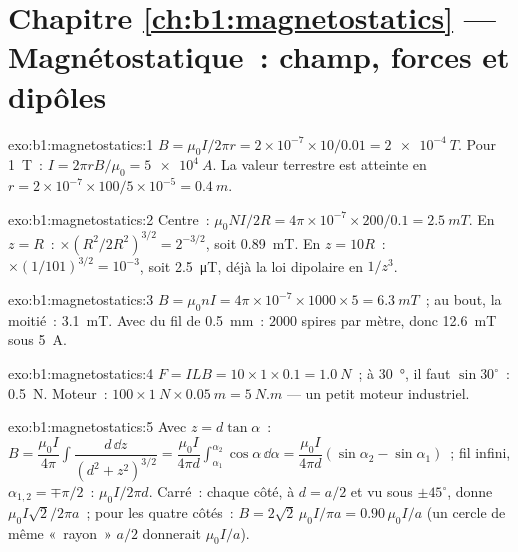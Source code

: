 \section*{Chapitre \ref{ch:b1:magnetostatics} --- Magnétostatique~: champ, forces et dipôles}

\begin{solution}{exo:b1:magnetostatics:1}
$B = \mu_0I/2\pi r = 2 \times 10^{-7} \times 10/0.01 = \qty{2e-4}{T}$. Pour \qty{1}{T}~:
$I = 2\pi rB/\mu_0 = \qty{5e4}{A}$. La valeur terrestre est atteinte en $r = 2 \times 10^{-7} \times
100/5 \times 10^{-5} = \qty{0.4}{m}$.
\end{solution}

\begin{solution}{exo:b1:magnetostatics:2}
Centre~: $\mu_0NI/2R = 4\pi \times 10^{-7} \times 200/0.1 = \qty{2.5}{mT}$. En $z = R$~:
$\times(R^2/2R^2)^{3/2} = 2^{-3/2}$, soit \qty{0.89}{mT}. En $z = 10R$~: $\times(1/101)^{3/2}
= 10^{-3}$, soit \qty{2.5}{\micro T}, déjà la loi dipolaire en $1/z^3$.
\end{solution}

\begin{solution}{exo:b1:magnetostatics:3}
$B = \mu_0nI = 4\pi \times 10^{-7} \times 1000 \times 5 = \qty{6.3}{mT}$~; au bout,
la moitié~: \qty{3.1}{mT}. Avec du fil de \qty{0.5}{mm}~: $2000$ spires par mètre,
donc \qty{12.6}{mT} sous \qty{5}{A}.
\end{solution}

\begin{solution}{exo:b1:magnetostatics:4}
$F = ILB = 10 \times 1 \times 0.1 = \qty{1.0}{N}$~; à \qty{30}{\degree}, il faut $\sin30^\circ$~:
\qty{0.5}{N}. Moteur~: $100 \times \qty{1}{N} \times \qty{0.05}{m} = \qty{5}{N.m}$ ---
un petit moteur industriel.
\end{solution}

\begin{solution}{exo:b1:magnetostatics:5}
Avec $z = d\tan\alpha$~: $B = \dfrac{\mu_0I}{4\pi}\displaystyle\int\dfrac{d\,\dd z}{(d^2 + z^2)^{3/2}}
= \dfrac{\mu_0I}{4\pi d}\displaystyle\int_{\alpha_1}^{\alpha_2}\cos\alpha\,\dd\alpha = \dfrac{\mu_0I}{4\pi d}
(\sin\alpha_2 - \sin\alpha_1)$~; fil infini, $\alpha_{1,2} = \mp\pi/2$~: $\mu_0I/2\pi d$.
Carré~: chaque côté, à $d = a/2$ et vu sous $\pm45^\circ$, donne $\mu_0I\sqrt2/2\pi a$~;
pour les quatre côtés~: $B = 2\sqrt2\,\mu_0I/\pi a = 0.90\,\mu_0I/a$ (un cercle de même
«~rayon~» $a/2$ donnerait $\mu_0I/a$).
\end{solution}

